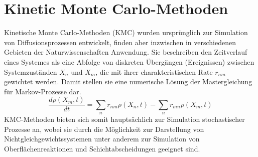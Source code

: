 \section{Kinetic Monte Carlo-Methoden}
\label{kmc}

Kinetische Monte Carlo-Methoden (KMC)\cite{voter_introduction_2007} wurden ursprünglich zur Simulation von Diffusionsprozessen entwickelt, finden aber inzwischen in verschiedenen Gebieten der Naturwissenschaften Anwendung\cite{yang_kinetic_2008,nielsen_parallel_2013,gosalvez_atomistic_2008}.
Sie beschreiben den Zeitverlauf eines Systemes als eine Abfolge von diskreten Übergängen (Ereignissen) zwischen Systemzuständen $X_n$ und $X_m$, die mit ihrer charakteristischen Rate $r_{n m}$ gewichtet werden.
Damit stellen sie eine numerische Lösung der Mastergleichung für Markov-Prozesse dar.
\begin{equation}
  \frac{d \rho(X_m,t)}{d t} = \sum_n{r_{n m}\rho(X_n,t) - \sum_n{r_{m n}\rho(X_m,t)}}
\end{equation}
KMC-Methoden bieten sich somit hauptsächlich zur Simulation stochastischer Prozesse an, wobei sie durch die Möglichkeit zur Darstellung von Nichtgleichgewichtssystemen unter anderem zur Simulation von Oberflächenreaktionen und Schichtabscheidungen geeignet sind\cite{battaile_kinetic_2008}.

